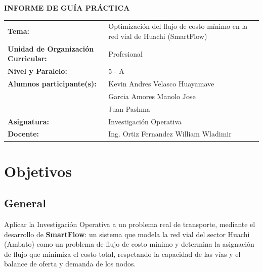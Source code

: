 \documentclass{article}
\begin{document}
\begin{center}
    {\large \textbf{INFORME DE GUÍA PRÁCTICA}} \\
\end{center}

\begin{flushleft}
\begin{tabular}{ l p{11cm} }
    \textbf{Tema:} & Optimización del flujo de costo mínimo en la red vial de Huachi (SmartFlow) \\
    \textbf{Unidad de Organización Curricular:} & Profesional \\
    \textbf{Nivel y Paralelo:} & 5 - A \\
    \textbf{Alumnos participante(s):} & Kevin Andres Velasco Huayamave \\
                                      & Garcia Amores Manolo Jose \\
                                      & Juan Pashma \\
    \textbf{Asignatura:} & Investigación Operativa \\
    \textbf{Docente:} & Ing. Ortiz Fernandez William Wladimir \\
\end{tabular}
\end{flushleft}

\tableofcontents
\newpage

\section{Objetivos}

\subsection{General}
Aplicar la Investigación Operativa a un problema real de transporte, mediante
el desarrollo de \textbf{SmartFlow}: un sistema que modela la red vial del sector
Huachi (Ambato) como un problema de flujo de costo mínimo y determina la
asignación de flujo que minimiza el costo total, respetando la capacidad de las
vías y el balance de oferta y demanda de los nodos.
\end{document}
